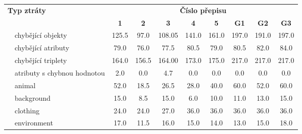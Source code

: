 \begin{table}[ht!]
	\centering
	\footnotesize
	\begin{tabular}{|c|l|c|c|c|c|c|c|c|c|}
		\hline
		\multicolumn{2}{|l|}{\multirow{2}{*}{\textbf{Typ ztráty}}}        & \multicolumn{8}{c|}{\textbf{Číslo přepisu}}                                                                                                       \\
		\cline{3-10}
		\multicolumn{2}{|l|}{}                                            & \textbf{1}                                  & \textbf{2} & \textbf{3} & \textbf{4} & \textbf{5} & \textbf{G1} & \textbf{G2} & \textbf{G3}         \\
		\hline
		                                                                  & chybějící objekty                           & 125.5      & 97.0       & 108.05     & 141.0      & 161.0       & 197.0       & 191.0       & 197.0 \\
		                                                                  & chybějící atributy                          & 79.0       & 76.0       & 77.5       & 80.5       & 79.0        & 80.5        & 82.0        & 84.0  \\
		                                                                  & chybějící triplety                          & 164.0      & 156.5      & 164.00     & 173.0      & 175.0       & 217.0       & 217.0       & 217.0 \\
		                                                                  & atributy s chybnou hodnotou                 & 2.0        & 0.0        & 4.7        & 0.0        & 0.0         & 0.0         & 0.0         & 0.0   \\
		\hline
		\multirow{7}{*}{\rotatebox[origin=c]{90}{chybějící obj.~s tagem}} & {animal}                                    & 52.0       & 18.5       & 26.5       & 28.0       & 40.0        & 60.0        & 52.0        & 60.0  \\
		                                                                  & {background}                                & 15.0       & 8.5        & 15.0       & 6.0        & 10.0        & 11.0        & 13.0        & 15.0  \\
		                                                                  & {clothing}                                  & 24.0       & 24.0       & 27.0       & 36.0       & 36.0        & 36.0        & 36.0        & 36.0  \\
		                                                                  & {environment}                               & 17.0       & 11.5       & 16.0       & 15.0       & 14.0        & 13.0        & 15.0        & 18.0  \\

\end{tabular}
\end{table}
